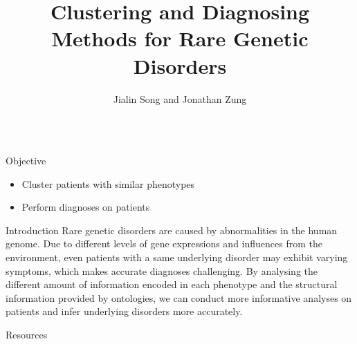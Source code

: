 \documentclass[final]{beamer} %
\title[]{{\fontsize{220}{240}\selectfont Clustering and Diagnosing Methods for Rare Genetic Disorders}}
\author[]{\huge Jialin Song and Jonathan Zung}
\institute[University of Toronto]{\huge Computational Biology Lab, University of Toronto}
\date{}
\begin{document}
  \begin{frame}{}
  \maketitle
  \vspace{-3cm}
    \begin{columns}[T]
      \begin{column}{0.3\linewidth}

     \begin{block}{\Huge Objective}
     \begin{itemize}
    \Large
     \item
     Cluster patients with similar phenotypes
    \item
    Perform diagnoses on patients
     \end{itemize}
      \end{block}

    \begin{block}{\Huge Introduction}
    \Large
    Rare genetic disorders are caused by abnormalities in the human genome. Due to different levels of gene expressions and influences from the environment, even patients with a same underlying disorder may exhibit varying symptoms, which makes accurate diagnoses challenging. By analysing the different amount of information encoded in each phenotype and the structural information provided by ontologies, we can conduct more informative analyses on patients and infer underlying disorders more accurately. 
   \vspace{1cm} 

    \end{block}
    
    \begin{block}{\Huge Resources}
 

\end{block}
\end{column}
\end{columns}
\end{frame}
\end{document}
